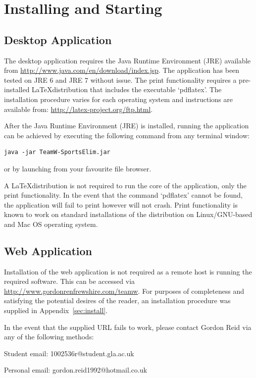 \section{Installing and Starting}

\subsection{Desktop Application}

The desktop application requires the Java Runtime Environment (JRE) available
from \url{http://www.java.com/en/download/index.jsp}. The application has been
tested on JRE 6 and JRE 7 without issue. The print functionality
requires a pre-installed \LaTeX distribution that includes the
executable `pdflatex'. The installation procedure varies for each
operating system and instructions are available from:
\url{http://latex-project.org/ftp.html}.

After the Java Runtime Environment (JRE) is installed, running the application
can be achieved by executing the following command from any terminal
window:
\begin{verbatim}
java -jar TeamW-SportsElim.jar
\end{verbatim}
or by launching from your favourite file browser.

A \LaTeX distribution is not required to run the core of the
application, only the print functionality. In the event that the
command `pdflatex' cannot be found, the application will fail to print
however will not crash. Print functionality is known to work on
standard installations of the distribution on Linux/GNU-based and Mac
OS operating system.

\subsection{Web Application}
\label{sec:WEBAPP}
Installation of the web application is not required as a remote host is running
the required software. This can be accessed via
\url{http://www.gordonrenfrewshire.com/teamw}. For purposes of completeness and
satisfying the potential desires of the reader, an installation procedure was
supplied in Appendix~\ref{sec:install}.

In the event that the supplied URL fails to work, please contact Gordon Reid via
any of the following methods:

Student email: 1002536r@student.gla.ac.uk

Personal email: gordon.reid1992@hotmail.co.uk

